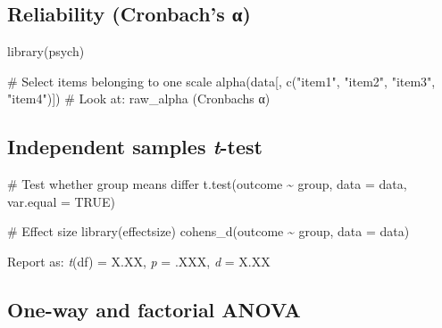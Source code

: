 \documentclass[
  11pt,
  a4paper,
]{scrbook}
\newenvironment{Shaded}{\begin{snugshade}}{\end{snugshade}}
\newcommand{\AttributeTok}[1]{\textcolor[rgb]{0.40,0.45,0.13}{#1}}
\newcommand{\CommentTok}[1]{\textcolor[rgb]{0.37,0.37,0.37}{#1}}
\newcommand{\ConstantTok}[1]{\textcolor[rgb]{0.56,0.35,0.01}{#1}}
\newcommand{\FunctionTok}[1]{\textcolor[rgb]{0.28,0.35,0.67}{#1}}
\newcommand{\NormalTok}[1]{\textcolor[rgb]{0.00,0.23,0.31}{#1}}
\newcommand{\SpecialCharTok}[1]{\textcolor[rgb]{0.37,0.37,0.37}{#1}}
\newcommand{\StringTok}[1]{\textcolor[rgb]{0.13,0.47,0.30}{#1}}
\begin{document}
\subsection{Reliability (Cronbach's
α)}\label{reliability-cronbachs-ux3b1}

\begin{Shaded}
\begin{Highlighting}[]
\FunctionTok{library}\NormalTok{(psych)}

\CommentTok{\# Select items belonging to one scale}
\FunctionTok{alpha}\NormalTok{(data[, }\FunctionTok{c}\NormalTok{(}\StringTok{"item1"}\NormalTok{, }\StringTok{"item2"}\NormalTok{, }\StringTok{"item3"}\NormalTok{, }\StringTok{"item4"}\NormalTok{)])}
\CommentTok{\# Look at: raw\_alpha (Cronbach\textquotesingle{}s α)}
\end{Highlighting}
\end{Shaded}

\subsection{\texorpdfstring{Independent samples
\emph{t}-test}{Independent samples t-test}}\label{independent-samples-t-test}

\begin{Shaded}
\begin{Highlighting}[]
\CommentTok{\# Test whether group means differ}
\FunctionTok{t.test}\NormalTok{(outcome }\SpecialCharTok{\textasciitilde{}}\NormalTok{ group, }\AttributeTok{data =}\NormalTok{ data, }\AttributeTok{var.equal =} \ConstantTok{TRUE}\NormalTok{)}

\CommentTok{\# Effect size}
\FunctionTok{library}\NormalTok{(effectsize)}
\FunctionTok{cohens\_d}\NormalTok{(outcome }\SpecialCharTok{\textasciitilde{}}\NormalTok{ group, }\AttributeTok{data =}\NormalTok{ data)}
\end{Highlighting}
\end{Shaded}

Report as: \emph{t}(df) = X.XX, \emph{p} = .XXX, \emph{d} = X.XX

\subsection{One-way and factorial
ANOVA}\label{one-way-and-factorial-anova}
\end{document}
